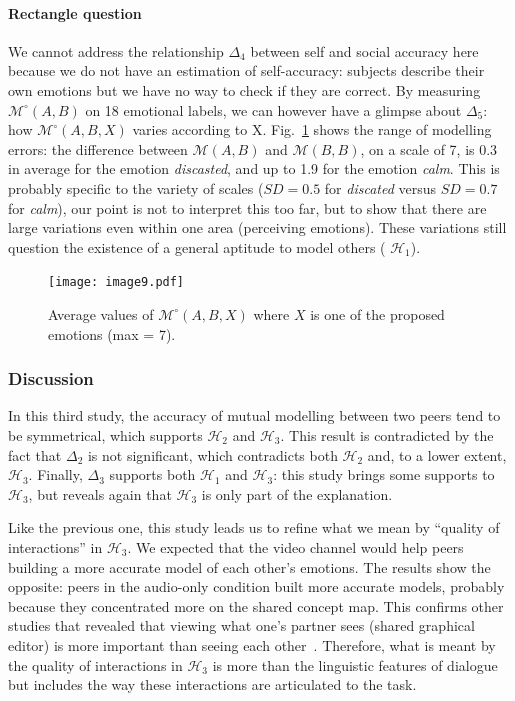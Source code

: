 \documentclass[natbib]{svjour3}
\newcommand{\gmodel}[2]{{$\mathcal{M}(#1, #2)$}}
\newcommand{\Model}[3]{{$\mathcal{M}^{\circ}(#1, #2, #3)$}}
\newcommand{\gModel}[2]{{$\mathcal{M}^{\circ}(#1, #2)$}}
\begin{document}
\paragraph{Rectangle question} We cannot address the relationship $\Delta_4$
between self and social accuracy here because we do not have an estimation of
self-accuracy: subjects describe their own emotions but we have no way to check if
they are correct. By measuring \gModel{A}{B} on  18 emotional labels,
we can however have a glimpse about $\Delta_5$: how \Model{A}{B}{X} varies
according to X.  Fig.~\ref{study3:deg_m_values} shows the range of modelling
errors: the difference between \gmodel{A}{B} and \gmodel{B}{B}, on a scale of 7,
is 0.3 in average for the emotion \emph{discasted}, and up to 1.9 for the
emotion \emph{calm}. This is probably specific to the variety of scales  ($SD=
0.5$ for \emph{discated} versus $SD=0.7$ for \emph{calm}), our point is not to
interpret this too far, but to show that there are large variations even within one
area  (perceiving emotions). These variations still question the existence of
a general aptitude to model others ( $\mathcal{H}_{1}$).

\begin{figure}[ht!]
        \centering
        \texttt{[image: image9.pdf]}
        \caption{Average values of \Model{A}{B}{X} where $X$ is one of the proposed
        emotions (max = 7).}
        \label{study3:deg_m_values}
\end{figure}



\subsubsection*{Discussion} 

In this third study, the accuracy of mutual modelling  between two peers tend to
be symmetrical, which  supports $\mathcal{H}_{2}$ and $\mathcal{H}_{3}$. This
result is contradicted by the fact that $\Delta_2$ is not significant, which
contradicts both $\mathcal{H}_{2}$ and, to a lower extent, $\mathcal{H}_{3}$.
Finally, $\Delta_3$ supports both $\mathcal{H}_{1}$ and  $\mathcal{H}_{3}$: this
study brings some supports to  $\mathcal{H}_{3}$, but reveals again that
$\mathcal{H}_{3}$ is only part of the explanation.

Like the previous one, this study leads us to refine what we mean by ``quality
of interactions'' in $\mathcal{H}_{3}$. We  expected that the video channel
would help peers building a more accurate model of each other's emotions. The
results show the opposite: peers in the audio-only condition built more accurate
models, probably because they concentrated more on the shared concept map. This
confirms other studies that revealed that viewing what one's partner sees
(shared graphical editor) is more important than seeing each
other~\citep{gaver1993one,anderson1997impact}. Therefore, what is meant by the
quality of interactions in $\mathcal{H}_{3}$ is more than the linguistic
features of dialogue but includes the way these interactions are articulated to
the task.
\end{document}
